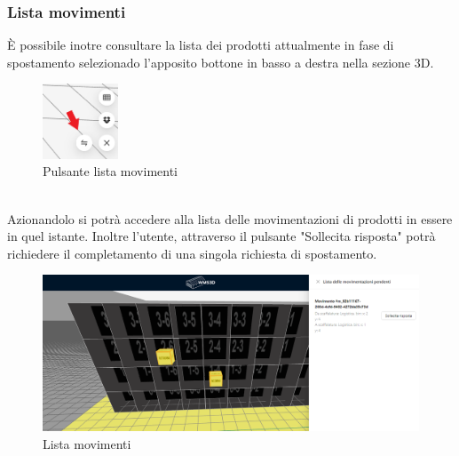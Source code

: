         \subsubsection{Lista movimenti} \label{sec:movimento:lista}
        \noindent È possibile inotre consultare la lista dei prodotti attualmente in fase di spostamento selezionado l'apposito bottone in basso a destra nella sezione 3D.
        \begin{figure}[h!]
            \centering
            \includegraphics[width=0.2\textwidth]{images/pulsante_lista.png}
            \caption{Pulsante lista movimenti}
        \end{figure}\\
        \noindent Azionandolo si potrà accedere alla lista delle movimentazioni di prodotti in essere in quel istante.
        Inoltre l'utente, attraverso il pulsante "Sollecita risposta" potrà richiedere il completamento di una singola richiesta di spostamento. \\
        \begin{figure}[h!]
            \centering
            \includegraphics[width=1.0\textwidth]{images/lista_movimenti.png}
            \caption{Lista movimenti}
        \end{figure}\\

